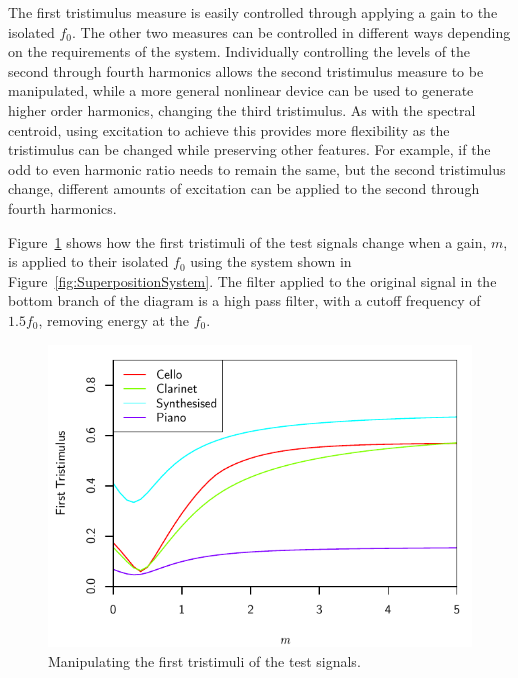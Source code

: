 		The first tristimulus measure is easily controlled through applying a gain to the isolated $f_{0}$.  The
		other two measures can be controlled in different ways depending on the requirements of the system.
		Individually controlling the levels of the second through fourth harmonics allows the second tristimulus
		measure to be manipulated, while a more general nonlinear device can be used to generate higher order
		harmonics, changing the third tristimulus. As with the spectral centroid, using excitation to achieve this
		provides more flexibility as the tristimulus can be changed while preserving other features. For example,
		if the odd to even harmonic ratio needs to remain the same, but the second tristimulus change, different
		amounts of excitation can be applied to the second through fourth harmonics.

		Figure~\ref{fig:MoveTristimulus1} shows how the first tristimuli of the test signals change when a gain,
		$m$, is applied to their isolated $f_{0}$ using the system shown in Figure~\ref{fig:SuperpositionSystem}.
		The filter applied to the original signal in the bottom branch of the diagram is a high pass filter, with a
		cutoff frequency of $1.5f_{0}$, removing energy at the $f_{0}$.

		\begin{figure}[h!]
			\centering
			\includegraphics{chapter6/Images/MoveTristimulus1.pdf}
			\caption{Manipulating the first tristimuli of the test signals.}
			\label{fig:MoveTristimulus1}
		\end{figure}


